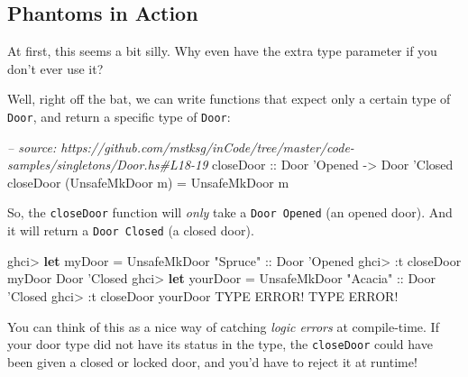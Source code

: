 \documentclass[]{article}
\newenvironment{Shaded}{}{}
\newcommand{\KeywordTok}[1]{\textcolor[rgb]{0.00,0.44,0.13}{\textbf{#1}}}
\newcommand{\DataTypeTok}[1]{\textcolor[rgb]{0.56,0.13,0.00}{#1}}
\newcommand{\CharTok}[1]{\textcolor[rgb]{0.25,0.44,0.63}{#1}}
\newcommand{\StringTok}[1]{\textcolor[rgb]{0.25,0.44,0.63}{#1}}
\newcommand{\CommentTok}[1]{\textcolor[rgb]{0.38,0.63,0.69}{\textit{#1}}}
\newcommand{\OtherTok}[1]{\textcolor[rgb]{0.00,0.44,0.13}{#1}}
\newcommand{\FunctionTok}[1]{\textcolor[rgb]{0.02,0.16,0.49}{#1}}
\newcommand{\NormalTok}[1]{#1}
\begin{document}
\subsection{Phantoms in Action}\label{phantoms-in-action}

At first, this seems a bit silly. Why even have the extra type parameter if you
don't ever use it?

Well, right off the bat, we can write functions that expect only a certain type
of \texttt{Door}, and return a specific type of \texttt{Door}:

\begin{Shaded}
\begin{Highlighting}[]
\CommentTok{-- source: https://github.com/mstksg/inCode/tree/master/code-samples/singletons/Door.hs#L18-19}
\OtherTok{closeDoor ::} \DataTypeTok{Door} \CharTok{'Opened -> Door '}\DataTypeTok{Closed}
\NormalTok{closeDoor (}\DataTypeTok{UnsafeMkDoor}\NormalTok{ m) }\FunctionTok{=} \DataTypeTok{UnsafeMkDoor}\NormalTok{ m}
\end{Highlighting}
\end{Shaded}

So, the \texttt{closeDoor} function will \emph{only} take a
\texttt{Door\ \textquotesingle{}Opened} (an opened door). And it will return a
\texttt{Door\ \textquotesingle{}Closed} (a closed door).

\begin{Shaded}
\begin{Highlighting}[]
\NormalTok{ghci}\FunctionTok{>} \KeywordTok{let}\NormalTok{ myDoor }\FunctionTok{=} \DataTypeTok{UnsafeMkDoor} \StringTok{"Spruce"}\OtherTok{ ::} \DataTypeTok{Door} \CharTok{'Opened}
\NormalTok{ghci}\FunctionTok{>} \FunctionTok{:}\NormalTok{t closeDoor myDoor}
\DataTypeTok{Door} \CharTok{'Closed}
\NormalTok{ghci}\FunctionTok{>} \KeywordTok{let}\NormalTok{ yourDoor }\FunctionTok{=} \DataTypeTok{UnsafeMkDoor} \StringTok{"Acacia"}\OtherTok{ ::} \DataTypeTok{Door} \CharTok{'Closed}
\NormalTok{ghci}\FunctionTok{>} \FunctionTok{:}\NormalTok{t closeDoor yourDoor}
\DataTypeTok{TYPE} \DataTypeTok{ERROR}\FunctionTok{!}  \DataTypeTok{TYPE} \DataTypeTok{ERROR}\FunctionTok{!}
\end{Highlighting}
\end{Shaded}

You can think of this as a nice way of catching \emph{logic errors} at
compile-time. If your door type did not have its status in the type, the
\texttt{closeDoor} could have been given a closed or locked door, and you'd have
to reject it at runtime!
\end{document}
